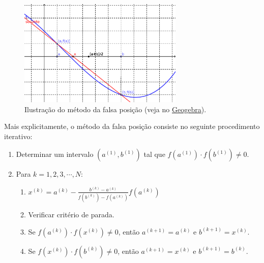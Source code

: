 \begin{figure}[h!]
  \centering
  \includegraphics[width=0.7\textwidth]{./cap_eq1d/dados/fig_falsapos/fig_falsapos}
  \caption{Ilustração do método da falsa posição (veja no \href{https://github.com/phkonzen/notas/blob/master/src/MatematicaNumerica/cap_eq1d/dados/fig_falsapos/fig_falsapos.ggb}{Geogebra}).}
  \label{fig:falsapos}
\end{figure}

Mais explicitamente, o método da falsa posição consiste no seguinte procedimento iterativo:
\begin{enumerate}
\item Determinar um intervalo $(a^{(1)}, b^{(1)})$ tal que $f(a^{(1)})\cdot f(b^{(1)}) \neq 0$.
\item Para $k = 1, 2, 3, \cdots, N$:
  \begin{enumerate}[2.1]
  \item $\displaystyle x^{(k)} = a^{(k)} - \frac{b^{(k)}-a^{(k)}}{f(b^{(k)})-f(a^{(k)})}f(a^{(k)})$
  \item Verificar critério de parada.
  \item Se $f(a^{(k)})\cdot f(x^{(k)}) \neq 0$, então $a^{(k+1)}=a^{(k)}$ e $b^{(k+1)}=x^{(k)}$.
  \item Se $f(x^{(k)})\cdot f(b^{(k)}) \neq 0$, então $a^{(k+1)}=x^{(k)}$ e $b^{(k+1)}=b^{(k)}$.
  \end{enumerate}
\end{enumerate}

